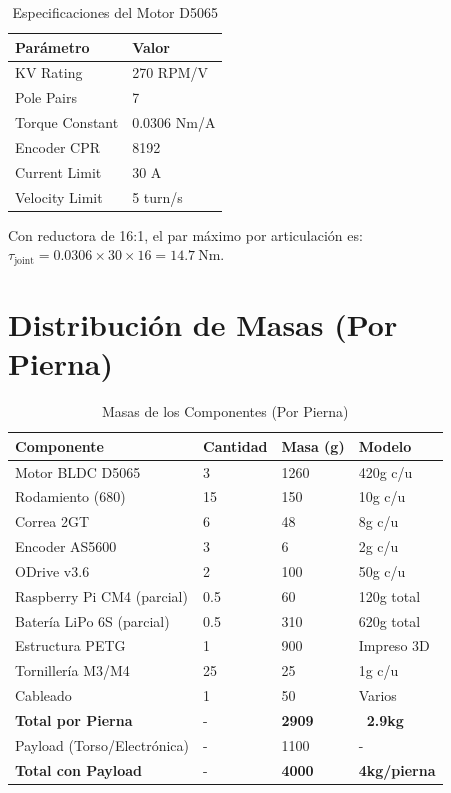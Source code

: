 \begin{table}[h]
\centering
\caption{Especificaciones del Motor D5065}
\label{tab:motor_specs}
\begin{tabular}{ll}
\toprule
\textbf{Parámetro} & \textbf{Valor} \\
\midrule
KV Rating & 270 RPM/V \\
Pole Pairs & 7 \\
Torque Constant & 0.0306 Nm/A \\
Encoder CPR & 8192 \\
Current Limit & 30 A \\
Velocity Limit & 5 turn/s \\
\bottomrule
\end{tabular}
\end{table}

Con reductora de 16:1, el par máximo por articulación es: $\tau_{\text{joint}} = 0.0306 \times 30 \times 16 = \SI{14.7}{\newton\meter}$.

\section{Distribución de Masas (Por Pierna)}

\begin{table}[h]
\centering
\caption{Masas de los Componentes (Por Pierna)}
\label{tab:masas}
\begin{tabular}{llll}
\toprule
\textbf{Componente} & \textbf{Cantidad} & \textbf{Masa (g)} & \textbf{Modelo} \\
\midrule
Motor BLDC D5065 & 3 & 1260 & 420g c/u \\
Rodamiento (680) & 15 & 150 & 10g c/u \\
Correa 2GT & 6 & 48 & 8g c/u \\
Encoder AS5600 & 3 & 6 & 2g c/u \\
ODrive v3.6 & 2 & 100 & 50g c/u \\
Raspberry Pi CM4 (parcial) & 0.5 & 60 & 120g total \\
Batería LiPo 6S (parcial) & 0.5 & 310 & 620g total \\
Estructura PETG & 1 & 900 & Impreso 3D \\
Tornillería M3/M4 & 25 & 25 & 1g c/u \\
Cableado & 1 & 50 & Varios \\
\textbf{Total por Pierna} & - & \textbf{2909} & \textbf{~2.9kg} \\
Payload (Torso/Electrónica) & - & 1100 & - \\
\textbf{Total con Payload} & - & \textbf{4000} & \textbf{4kg/pierna} \\
\bottomrule
\end{tabular}
\end{table}

